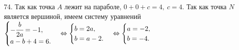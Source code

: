 74. Так как точка $A$ лежит на параболе, $0+0+c=4,\ c=4.$ Так как точка $N$ является вершиной, имеем систему уравнений
$\begin{cases}-\cfrac{b}{2a}=-1,\\ a-b+4=6.\end{cases}\Leftrightarrow\begin{cases}b=2a,\\ b=a-2.\end{cases}\Leftrightarrow\begin{cases}a=-2,\\ b=-4.\end{cases}$\\
